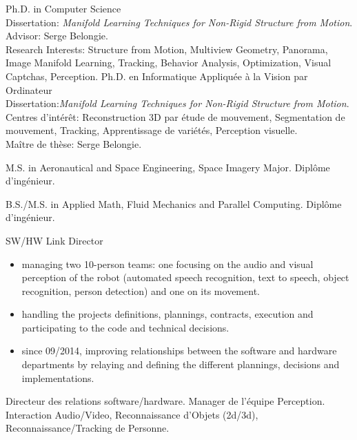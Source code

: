 \documentclass{article}
\begin{document}


\begin{llist}

 
{
Ph.D. in Computer Science\\
Dissertation: \textit{Manifold Learning Techniques for Non-Rigid Structure from
Motion}.\\
Advisor: Serge Belongie.\\
Research Interests: Structure from Motion, Multiview Geometry, Panorama, Image Manifold Learning, Tracking, Behavior Analysis, Optimization, Visual Captchas, Perception.
}
{
Ph.D. en Informatique Appliqu\'{e}e \`{a} la Vision par Ordinateur\\
Dissertation:\textit{Manifold Learning Techniques for Non-Rigid Structure from
Motion}.\\
Centres d'int\'{e}r\^{e}t: Reconstruction 3D par \'{e}tude de mouvement, Segmentation de mouvement, Tracking, 
Apprentissage de vari\'{e}t\'{e}s, Perception visuelle.\\
Ma\^{i}tre de th\`{e}se: Serge Belongie.
}

 
{
M.S. in Aeronautical and Space Engineering, Space Imagery Major.
}
{
Dipl\^{o}me d'ing\'{e}nieur.
}

 
{
B.S./M.S. in Applied Math, Fluid Mechanics and Parallel Computing.
}
{
Dipl\^{o}me d'ing\'{e}nieur.
}

{
}
{
}
\vspace{-0.33cm}

{
SW/HW Link Director
\vspace{-0.33cm}
\begin{itemize}
 \item managing two 10-person teams: one focusing on the audio and visual perception of the robot (automated speech 
recognition, text to speech, object recognition, person detection) and one on its movement.
 \item handling the projects definitions, plannings, contracts, execution and participating to the code and technical 
decisions.
 \item since 09/2014, improving relationships between the software and hardware departments by relaying and defining 
the different plannings, decisions and implementations.
\end{itemize}
}
{
Directeur des relations software/hardware.
Manager de l'\'{e}quipe Perception. Interaction Audio/Video, Reconnaissance d'Objets (2d/3d), Reconnaissance/Tracking 
de 
Personne.
}


\end{llist}
\end{document}
